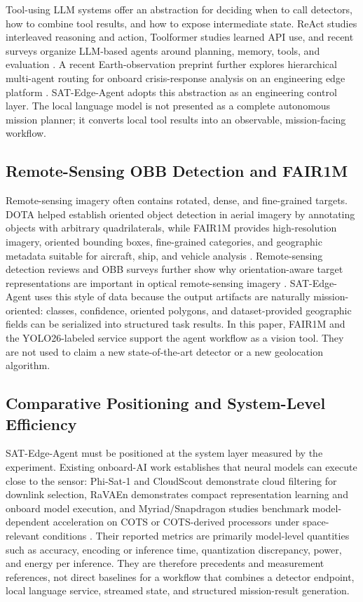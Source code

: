\documentclass[10pt,letterpaper]{article}
\begin{document}
Tool-using LLM systems offer an abstraction for deciding when to call detectors, how to combine tool results, and how to expose intermediate state. ReAct studies interleaved reasoning and action, Toolformer studies learned API use, and recent surveys organize LLM-based agents around planning, memory, tools, and evaluation \cite{react,toolformer,llm_agents_survey}. A recent Earth-observation preprint further explores hierarchical multi-agent routing for onboard crisis-response analysis on an engineering edge platform \cite{onboard_multiagent_eo}. SAT-Edge-Agent adopts this abstraction as an engineering control layer. The local language model is not presented as a complete autonomous mission planner; it converts local tool results into an observable, mission-facing workflow.

\subsection{Remote-Sensing OBB Detection and FAIR1M}

Remote-sensing imagery often contains rotated, dense, and fine-grained targets. DOTA helped establish oriented object detection in aerial imagery by annotating objects with arbitrary quadrilaterals, while FAIR1M provides high-resolution imagery, oriented bounding boxes, fine-grained categories, and geographic metadata suitable for aircraft, ship, and vehicle analysis \cite{dota,fair1m}. Remote-sensing detection reviews and OBB surveys further show why orientation-aware target representations are important in optical remote-sensing imagery \cite{rsod_review,obb_survey}. SAT-Edge-Agent uses this style of data because the output artifacts are naturally mission-oriented: classes, confidence, oriented polygons, and dataset-provided geographic fields can be serialized into structured task results. In this paper, FAIR1M and the YOLO26-labeled service support the agent workflow as a vision tool. They are not used to claim a new state-of-the-art detector or a new geolocation algorithm.

\subsection{Comparative Positioning and System-Level Efficiency}
\label{sec:comparative_positioning}

SAT-Edge-Agent must be positioned at the system layer measured by the experiment. Existing onboard-AI work establishes that neural models can execute close to the sensor: Phi-Sat-1 and CloudScout demonstrate cloud filtering for downlink selection, RaVAEn demonstrates compact representation learning and onboard model execution, and Myriad/Snapdragon studies benchmark model-dependent acceleration on COTS or COTS-derived processors under space-relevant conditions \cite{phisat1,cloudscout,ravaen,fast_onboard_training,edge_processor_benchmark}. Their reported metrics are primarily model-level quantities such as accuracy, encoding or inference time, quantization discrepancy, power, and energy per inference. They are therefore precedents and measurement references, not direct baselines for a workflow that combines a detector endpoint, local language service, streamed state, and structured mission-result generation.
\end{document}
